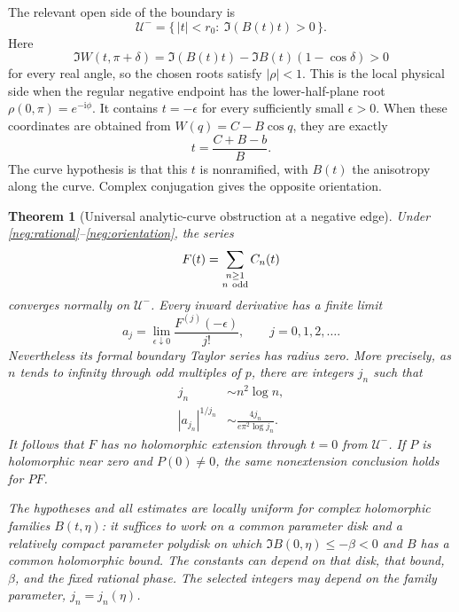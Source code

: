 \documentclass[11pt]{article}
\numberwithin{equation}{section}
\newtheorem{theorem}{Theorem}[section]
\theoremstyle{definition}
\newcommand{\ii}{\mathrm i}
\begin{document}
The relevant open side of the boundary is
\begin{equation}
 \mathcal U^-=\{\,|t|<r_0:\ \Im(B(t)t)>0\,\}.
 \label{neg:physical-side}
\end{equation}
Here
\[
 \Im W(t,\pi+\delta)
   =\Im(B(t)t)-\Im B(t)(1-\cos\delta)>0
 \]
for every real angle, so the chosen roots satisfy \(|\rho|<1\).
This is the local physical side when the regular negative endpoint
has the lower-half-plane root \(\rho(0,\pi)=e^{-\ii\phi}\).
It contains \(t=-\epsilon\) for every sufficiently small
\(\epsilon>0\).  When these coordinates are obtained from
\(W(q)=C-B\cos q\), they are exactly
\[
 t=\frac{C+B-b}{B}.
 \]
The curve hypothesis is that this \(t\) is nonramified, with \(B(t)\)
the anisotropy along the curve. Complex conjugation gives the opposite
orientation.

\begin{theorem}[Universal analytic-curve obstruction at a negative edge]
\label{neg:theorem}
Under \eqref{neg:rational}--\eqref{neg:orientation}, the series
\[
 F(t)=\sum_{\substack{n\ge1\\n\ {\rm odd}}}C_n(t)
 \]
converges normally on \(\mathcal U^-\).  Every inward derivative has
a finite limit
\begin{equation}
 a_j=\lim_{\epsilon\downarrow0}\frac{F^{(j)}(-\epsilon)}{j!},
 \qquad j=0,1,2,\ldots .
 \label{neg:jets}
\end{equation}
Nevertheless its formal boundary Taylor series has radius zero.
More precisely, as \(n\) tends to infinity through odd multiples of
\(p\), there are integers \(j_n\) such that
\begin{align}
 j_n&\sim n^2\log n,
 \label{neg:jn-statement}\\
 |a_{j_n}|^{1/j_n}
   &\sim \frac{4j_n}{e\pi^2\log j_n}.
 \label{neg:growth-statement}
\end{align}
It follows that \(F\) has no holomorphic extension through \(t=0\)
from \(\mathcal U^-\).  If \(P\) is holomorphic near zero and
\(P(0)\ne0\), the same nonextension conclusion holds for \(P F\).

The hypotheses and all estimates are locally uniform for complex
holomorphic families \(B(t,\eta)\): it suffices to work on a common
parameter disk and a relatively compact parameter polydisk on which
\(\Im B(0,\eta)\le-\beta<0\) and \(B\) has a common holomorphic bound.
The constants can depend on that disk, that bound, \(\beta\), and
the fixed rational phase. The selected integers may depend on the
family parameter, \(j_n=j_n(\eta)\).
\end{theorem}
\end{document}
